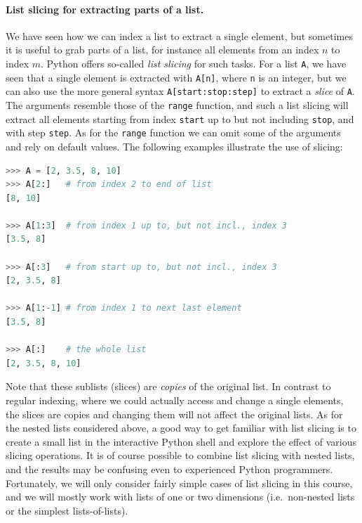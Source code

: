 \documentclass[graybox,envcountchap,sectrefs,final]{svmonodo}
\begin{document}
\paragraph{List slicing for extracting parts of a list.}
We have seen how we can index a list to extract a single element, but sometimes it is useful to grab parts of a list, for instance
all elements from an index $n$ to index $m$. Python offers so-called \emph{list slicing} for such tasks. For a list \texttt{A}, we have seen
that a single element is extracted with \texttt{A[n]}, where \texttt{n} is an integer, but we can also use the more general syntax \texttt{A[start:stop:step]}
to extract a \emph{slice} of \texttt{A}. The arguments resemble those of the \texttt{range} function, and such a list slicing will extract all
elements starting from index \texttt{start} up to but not including \texttt{stop}, and with step \texttt{step}. As for the \texttt{range} function we can omit some
of the arguments and rely on default values. The following examples illustrate the use of slicing:
\begin{lstlisting}[language=Python,style=blue1]
>>> A = [2, 3.5, 8, 10]
>>> A[2:]   # from index 2 to end of list
[8, 10]

>>> A[1:3]  # from index 1 up to, but not incl., index 3
[3.5, 8]

>>> A[:3]   # from start up to, but not incl., index 3
[2, 3.5, 8]

>>> A[1:-1] # from index 1 to next last element
[3.5, 8]

>>> A[:]    # the whole list
[2, 3.5, 8, 10]
\end{lstlisting}
Note that these sublists (slices) are \emph{copies} of the original list. In contrast to regular indexing, where we could actually access
and change a single elements, the slices are copies and changing them will not affect the original lists. As for the nested lists
considered above, a good way to get familiar with list slicing is to create a small list in the interactive Python shell and explore the
effect of various slicing operations. It is of course possible to combine list slicing with nested lists, and the results may
be confusing even to experienced Python programmers. Fortunately, we will only consider fairly simple cases of list slicing in this
course, and we will mostly work with lists of one or two dimensions (i.e.~non-nested lists or the simplest lists-of-lists).
\end{document}
